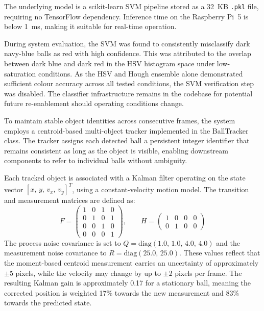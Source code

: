 The underlying model is a scikit-learn SVM pipeline stored as a 32~KB
\texttt{.pkl} file, requiring no TensorFlow dependency. Inference time on the
Raspberry Pi~5 is below 1~ms, making it suitable for real-time operation.

During system evaluation, the SVM was found to consistently misclassify dark
navy-blue balls as red with high confidence. This was attributed to the overlap
between dark blue and dark red in the HSV histogram space under low-saturation
conditions. As the HSV and Hough ensemble alone demonstrated sufficient colour
accuracy across all tested conditions, the SVM verification step was disabled.
The classifier infrastructure remains in the codebase for potential future
re-enablement should operating conditions change.


To maintain stable object identities across consecutive frames, the system employs
a centroid-based multi-object tracker implemented in the BallTracker class. The
tracker assigns each detected ball a persistent integer identifier that remains
consistent as long as the object is visible, enabling downstream components to
refer to individual balls without ambiguity.

Each tracked object is associated with a Kalman filter operating on the state
vector $[x,\, y,\, v_x,\, v_y]^T$, using a constant-velocity motion model. The
transition and measurement matrices are defined as:
\begin{equation}
    F = \begin{pmatrix} 1 & 0 & 1 & 0 \\ 0 & 1 & 0 & 1 \\
    0 & 0 & 1 & 0 \\ 0 & 0 & 0 & 1 \end{pmatrix}, \qquad
    H = \begin{pmatrix} 1 & 0 & 0 & 0 \\ 0 & 1 & 0 & 0 \end{pmatrix}
\end{equation}
The process noise covariance is set to $Q = \mathrm{diag}(1.0,\, 1.0,\, 4.0,\,
4.0)$ and the measurement noise covariance to $R = \mathrm{diag}(25.0,\, 25.0)$.
These values reflect that the moment-based centroid measurement carries an
uncertainty of approximately $\pm 5$ pixels, while the velocity may change by up
to $\pm 2$ pixels per frame. The resulting Kalman gain is approximately 0.17 for a
stationary ball, meaning the corrected position is weighted 17\% towards the new
measurement and 83\% towards the predicted state.

